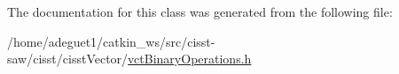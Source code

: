 The documentation for this class was generated from the following file\-:\begin{DoxyCompactItemize}
\item 
/home/adeguet1/catkin\-\_\-ws/src/cisst-\/saw/cisst/cisst\-Vector/\hyperlink{vct_binary_operations_8h}{vct\-Binary\-Operations.\-h}\end{DoxyCompactItemize}
